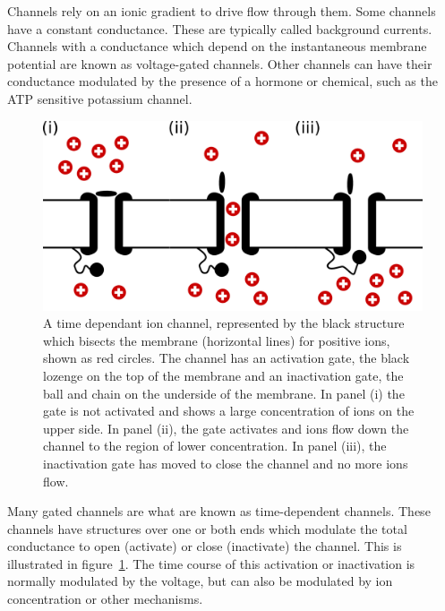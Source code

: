 Channels rely on an ionic gradient to drive flow through them.
Some channels have a constant conductance.
These are typically called background currents.
Channels with a conductance which depend on the instantaneous membrane potential
are known as voltage-gated channels.
Other channels can have their conductance modulated by the presence of a
hormone or chemical, such as the ATP sensitive potassium channel.
\begin{figure}
\begin{center}
\includegraphics{figures/intro/activation_gate}
\end{center}
\caption[Time-Dependent Ion Channel]{
\label{fig:intro:heart:gated_ion}
A time dependant ion channel, represented by the black structure which bisects
the membrane (horizontal lines) for positive ions, shown as red circles.
The channel has an activation gate, the black lozenge on the top of the
membrane and an inactivation gate, the ball and chain on the underside of the
membrane.
In panel (i) the gate is not activated and shows a large concentration of ions
on the upper side.
In panel (ii), the gate activates and ions flow down the channel to the region
of lower concentration.
In panel (iii), the inactivation gate has moved to close the channel and no more
ions flow.
}
\end{figure}
Many gated channels are what are known as time-dependent channels.
These channels have structures over one or both ends which modulate the total
conductance to open (activate) or close (inactivate) the channel.
This is illustrated in figure~\ref{fig:intro:heart:gated_ion}.
The time course of this activation or inactivation is normally modulated by the
voltage, but can also be modulated by ion concentration or other mechanisms.
